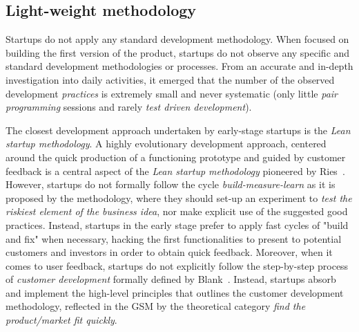 \documentclass[10pt,journal,letterpaper,compsoc]{IEEEtran}
\begin{document}
\subsection{Light-weight methodology} 
Startups do not apply any standard development methodology. When focused on 
building the first version of the product, startups do not observe any 
specific and standard development methodologies or processes. From an accurate 
and in-depth investigation into daily activities, it emerged that the number of 
the observed development \textit{practices} is extremely small and never 
systematic (only little \textit{pair programming} sessions and rarely 
\textit{test driven development}). 

The closest development approach undertaken by early-stage startups is the
\textit{Lean startup methodology}. A highly evolutionary development approach,
centered around the quick production of a functioning prototype and guided by
customer feedback is a central aspect of the \textit{Lean startup methodology}
pioneered by Ries~\cite{Ries2011}. However, startups do not formally follow the
cycle \textit{build-measure-learn} as it is proposed by the methodology, where
they should set-up an experiment to \textit{test the riskiest element of the
business idea}, nor make explicit use of the suggested good practices. Instead,
startups in the early stage prefer to apply fast cycles of "build and fix"
when necessary, hacking the first functionalities to present to potential
customers and investors in order to obtain quick feedback. 
Moreover, when it comes to user feedback, startups do not explicitly follow 
the step-by-step process of \textit{customer development} formally defined by 
Blank~\cite{Blank2005}. Instead, startups absorb and implement the high-level
principles that outlines the customer development methodology, reflected in the 
GSM by the theoretical category \textit{find the product/market fit quickly}.
\end{document}
